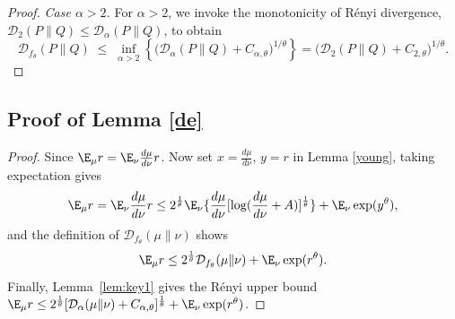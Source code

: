 \documentclass[11pt]{article}
\providecommand{\I}{\frac{1}{\theta}}
\providecommand{\DD}{\mathcal{D}}
\providecommand{\al}{\alpha}
\renewcommand{\paragraph}[1]{\noindent\textit{#1}}
\providecommand{\Renyi}{R\'enyi }
\begin{document}
\begin{proof}
\paragraph{Case $\alpha>2$.}
For $\alpha>2$, we invoke the monotonicity of \Renyi divergence,
$\DD_2(P\|Q)\le \DD_\alpha(P\|Q)$, to obtain
\[
\DD_{f_\theta}(P\|Q)
\;\le\;
\inf_{\alpha>2}
\left\{
\bigl(\DD_\alpha(P\|Q)+C_{\alpha,\theta}\bigr)^{1/\theta}
\right\}
=
\bigl(\DD_2(P\|Q)+C_{2,\theta}\bigr)^{1/\theta}.
\]
\end{proof}

\subsection{Proof of Lemma \ref{de}}
\begin{proof}
Since
$\E_\mu r = \E_\nu \frac{d \mu}{d \nu} r$. Now set $x=\frac{d \mu}{d \nu}$, $y=r$ in Lemma \ref{young}, taking expectation gives
\[
\E_\mu r = \E_\nu \frac{d \mu}{d \nu} r\leq 2^{\frac{1}{\theta}} \E_\nu \{\frac{d \mu}{d \nu} [\log(\frac{d \mu}{d \nu} + A)]^{\frac{1}{\theta}}\} + \E_\nu\exp(y^\theta),
\]
and the definition of $\DD_{f_\theta}(\mu \| \nu)$ shows
\[
\E_\mu r \leq 2^\I\DD_{f_\theta}(\mu \| \nu) + \E_\nu \exp(r^\theta).
\]
Finally, Lemma~\ref{lem:key1} gives the R\'enyi upper bound
$\E_\mu r \leq 2^\I[\DD_\al(\mu \| \nu)+ C_{\alpha,\theta}]^\I+ \E_\nu \exp(r^\theta)$.
\end{proof}




\end{document}
